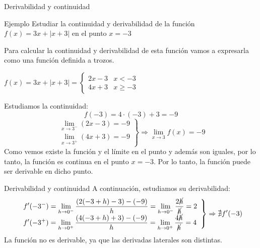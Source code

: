 \documentclass[8pt]{beamer}
\begin{document}
\begin{frame}{Derivabilidad y continuidad}
\begin{exampleblock}{Ejemplo}
Estudiar la continuidad y derivabilidad de la función $f(x)=3x+|x+3|$ en el punto $x=-3$	
\end{exampleblock}
\pause
Para calcular la continuidad y derivabilidad de esta función vamos a expresarla como una función definida a trozos.

$f(x)=3x+|x+3| = \begin{cases} 2x-3 & x < -3 \\ 4x+3 & x \geq -3 \end{cases} $

\pause
Estudiamos la continuidad:
\[ f(-3)= 4\cdot(-3) +3 = -9 \]
\[ \displaystyle \left. \begin{array}{l} \displaystyle \lim_{x \rightarrow 3^-} (2x-3) = -9 \\ \displaystyle \lim_{x \rightarrow 3^+} (4x+3) = -9 \end{array} \right\rbrace \Rightarrow \lim_{x \rightarrow 3} f(x) = -9 \] 
\pause
Como vemos existe la función y el límite en el punto y además son iguales, por lo tanto, la función es continua en el punto $x=-3$. Por lo tanto, la función puede ser derivable en dicho punto.
\end{frame}
\begin{frame}{Derivabilidad y continuidad}
A continuación, estudiamos su derivabilidad:
\pause
\[ \displaystyle \left. \begin{array}{l}\displaystyle  f'(-3^-) = \lim_{ h \rightarrow 0^-} \dfrac{(2(-3+h)-3)-(-9)}{h} = \lim_{ h \rightarrow 0^-} \dfrac{2\cancel{h}}{\cancel{h}}= 2 \\ \displaystyle f'(-3^+)= \lim_{ h \rightarrow 0^+} \dfrac{(4(-3+h)+3)-(-9)}{h} = \lim_{ h \rightarrow 0^+} \dfrac{4\cancel{h}}{\cancel{h}}= 4 \end{array} \right\rbrace \Rightarrow \nexists f'(-3) \]
\pause
La función no es derivable, ya que las derivadas laterales son distintas.



\end{frame}
\end{document}
